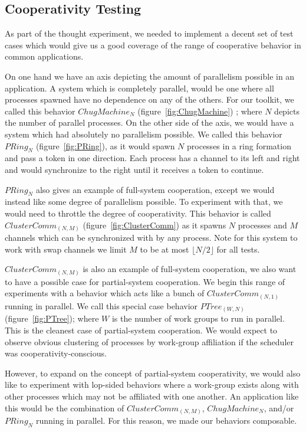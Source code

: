 \subsection{Cooperativity Testing}\label{sec:cooperativity testing}

As part of the thought experiment, we needed to implement a decent set of test 
cases which would give us a good coverage of the range of cooperative behavior
in common applications. 

On one hand we have an axis depicting the amount of parallelism possible in an 
application. A system which is completely parallel, would be one where all 
processes spawned have no dependence on any of the others. For our toolkit, we 
called this behavior $ChugMachine_N$ (figure~\ref{fig:ChugMachine}) ; where $N$ depicts the number of parallel 
processes. On the other side of the axis, we would have a system which had 
absolutely no parallelism possible. We called this behavior $PRing_N$ (figure~\ref{fig:PRing}), as it
would spawn $N$ processes in a ring formation and pass a token in one direction.
Each process has a channel to its left and right and would synchronize to the 
right until it receives a token to continue. 

$PRing_N$ also gives an example of full-system cooperation, except we would 
instead like some degree of parallelism possible. To experiment with that, we 
would need to throttle the degree of cooperativity. This behavior is called
$ClusterComm_{(N,M)}$ (figure~\ref{fig:ClusterComm}) as it spawns $N$ processes and $M$ channels which can be
synchronized with by any process. Note for this system to work with swap 
channels we limit $M$ to be at most $\lfloor N/2 \rfloor$ for all tests. 

$ClusterComm_{(N,M)}$ is also an example of full-system cooperation, we also
want to have a possible case for partial-system cooperation. We begin this range
of experiments with a behavior which acts like a bunch of $ClusterComm_{(N,1)}$
running in parallel. We call this special case behavior $PTree_{(W,N)}$ (figure~\ref{fig:PTree}); where $W$ is 
the number of work groups to run in parallel. This is the cleanest case of 
partial-system cooperation. We would expect to observe obvious clustering of 
processes by work-group affiliation if the scheduler was 
cooperativity-conscious.

However, to expand on the concept of partial-system cooperativity, we would 
also like to experiment with lop-sided behaviors where a work-group exists 
along with other processes which may not be affiliated with one another. An 
application like this would be the combination of $ClusterComm_{(N,M)}$, 
$ChugMachine_N$, and/or $PRing_N$ running in parallel. For this reason, we made
our behaviors composable.

